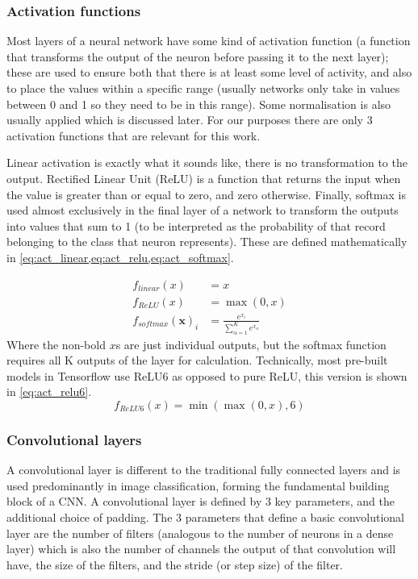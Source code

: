 \documentclass[12pt]{article}
\numberwithin{equation}{section}
\numberwithin{figure}{section}
\begin{document}
\subsubsection{Activation functions}
Most layers of a neural network have some kind of activation function (a function that transforms the output of the neuron before passing it to the next layer); these are used to ensure both that there is at least some level of activity, and also to place the values within a specific range (usually networks only take in values between 0 and 1 so they need to be in this range). Some normalisation is also usually applied which is discussed later. For our purposes there are only 3 activation functions that are relevant for this work.

Linear activation is exactly what it sounds like, there is no transformation to the output. Rectified Linear Unit (ReLU) is a function that returns the input when the value is greater than or equal to zero, and zero otherwise. Finally, softmax is used almost exclusively in the final layer of a network to transform the outputs into values that sum to 1 (to be interpreted as the probability of that record belonging to the class that neuron represents). These are defined mathematically in \cref{eq:act_linear,eq:act_relu,eq:act_softmax}.

\begin{align}
	f_{linear}(x) &= x \label{eq:act_linear}\\
	f_{ReLU}(x)   &= \max(0, x) \label{eq:act_relu}\\
	f_{softmax}(\bm{x})_i &= \frac{e^{x_i}}{\sum_{\alpha=1}^{K}{e^{x_\alpha}}}\label{eq:act_softmax}
\end{align}
Where the non-bold $x$s are just individual outputs, but the softmax function requires all K outputs of the layer for calculation. Technically, most pre-built models in Tensorflow use ReLU6 as opposed to pure ReLU, this version is shown in \cref{eq:act_relu6}.
\begin{equation}
	f_{ReLU6}(x) = \min(\max(0, x), 6) \label{eq:act_relu6}
\end{equation}

\subsubsection{Convolutional layers}
A convolutional layer  is different to the traditional fully connected layers and is used predominantly in image classification, forming the fundamental building block of a CNN. A convolutional layer is defined by 3 key parameters, and the additional choice of padding. The 3 parameters that define a basic convolutional layer are the number of filters (analogous to the number of neurons in a dense layer) which is also the number of channels the output of that convolution will have, the size of the filters, and the stride (or step size) of the filter. 
\end{document}
